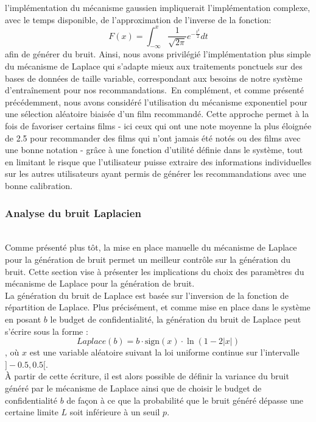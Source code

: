 \documentclass{article}
\begin{document}
l'implémentation du mécanisme gaussien impliquerait l'implémentation complexe, avec le temps disponible, de l'approximation de l'inverse de la fonction:
\begin{equation}
    F(x) = \int_{-\infty}^{x} \frac{1}{\sqrt{2\pi}} e^{-\frac{t^2}{2}} dt
\end{equation}
afin de générer du bruit. Ainsi, nous avons privilégié l'implémentation plus simple du mécanisme de Laplace qui s’adapte mieux aux traitements
ponctuels sur des bases de données de taille variable, correspondant aux besoins de notre système d'entraînement pour nos recommandations.\
En complément, et comme présenté précédemment, nous avons considéré l'utilisation du mécanisme exponentiel pour une sélection aléatoire biaisée d'un film recommandé.
Cette approche permet à la fois de favoriser certains films - ici ceux qui ont une note moyenne la plus éloignée de 2.5 pour recommander des films qui n'ont jamais été notés ou des
films avec une bonne notation - grâce à une fonction d'utilité définie dans le système, tout en limitant le risque que
l'utilisateur puisse extraire des informations individuelles sur les autres utilisateurs ayant permis de générer les recommandations avec une bonne
calibration.

\subsubsection{Analyse du bruit Laplacien}
$ $\\
Comme présenté plus tôt, la mise en place manuelle du mécanisme de Laplace pour la génération de bruit permet un meilleur contrôle sur la génération du bruit. Cette section vise à présenter
les implications du choix des paramètres du mécanisme de Laplace pour la génération de bruit.\\
La génération du bruit de Laplace est basée sur l'inversion de la fonction de répartition de Laplace. Plus précisément, et comme mise en place dans le système en posant $b$ le budget de confidentialité, la génération du bruit de Laplace peut s'écrire sous la forme :
\begin{equation}
    Laplace(b) = b \cdot \text{sign}(x) \cdot \ln(1 - 2|x|)
    \label{eq:laplace}
\end{equation}
, où $x$ est une variable aléatoire suivant la loi uniforme continue sur l'intervalle \( ]-0.5, 0.5[ \).\\
À partir de cette écriture, il est alors possible de définir la variance du bruit généré par le mécanisme de Laplace ainsi que de choisir le budget de confidentialité 
$b$ de façon à ce que la probabilité que le bruit généré dépasse une certaine limite $L$ soit inférieure à un seuil $p$.\\
\end{document}
